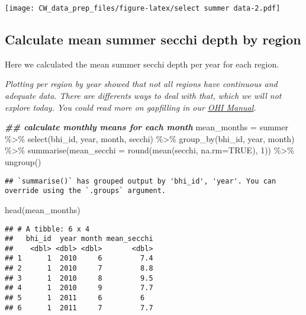 \documentclass[
]{article}
\newenvironment{Shaded}{\begin{snugshade}}{\end{snugshade}}
\newcommand{\AttributeTok}[1]{\textcolor[rgb]{0.77,0.63,0.00}{#1}}
\newcommand{\ConstantTok}[1]{\textcolor[rgb]{0.00,0.00,0.00}{#1}}
\newcommand{\DecValTok}[1]{\textcolor[rgb]{0.00,0.00,0.81}{#1}}
\newcommand{\DocumentationTok}[1]{\textcolor[rgb]{0.56,0.35,0.01}{\textbf{\textit{#1}}}}
\newcommand{\FunctionTok}[1]{\textcolor[rgb]{0.00,0.00,0.00}{#1}}
\newcommand{\NormalTok}[1]{#1}
\newcommand{\OtherTok}[1]{\textcolor[rgb]{0.56,0.35,0.01}{#1}}
\newcommand{\SpecialCharTok}[1]{\textcolor[rgb]{0.00,0.00,0.00}{#1}}
\begin{document}
\texttt{[image: CW\_data\_prep\_files/figure-latex/select summer data-2.pdf]}

\hypertarget{calculate-mean-summer-secchi-depth-by-region}{%
\subsection{Calculate mean summer secchi depth by
region}\label{calculate-mean-summer-secchi-depth-by-region}}

Here we calculated the mean summer secchi depth per year for each
region.

\emph{Plotting per region by year showed that not all regions have
continuous and adequate data. There are differents ways to deal with
that, which we will not explore today. You could read more on gapfilling
in our \href{http://ohi-science.org/manual/\#gapfilling}{OHI Manual}.}

\begin{Shaded}
\begin{Highlighting}[]
\DocumentationTok{\#\# calculate monthly means for each month}
\NormalTok{mean\_months }\OtherTok{=}\NormalTok{ summer }\SpecialCharTok{\%\textgreater{}\%} \FunctionTok{select}\NormalTok{(bhi\_id, year, month, secchi) }\SpecialCharTok{\%\textgreater{}\%}
              \FunctionTok{group\_by}\NormalTok{(bhi\_id, year, month) }\SpecialCharTok{\%\textgreater{}\%}
              \FunctionTok{summarise}\NormalTok{(}\AttributeTok{mean\_secchi =} \FunctionTok{round}\NormalTok{(}\FunctionTok{mean}\NormalTok{(secchi, }\AttributeTok{na.rm=}\ConstantTok{TRUE}\NormalTok{), }\DecValTok{1}\NormalTok{)) }\SpecialCharTok{\%\textgreater{}\%}
              \FunctionTok{ungroup}\NormalTok{()}
\end{Highlighting}
\end{Shaded}

\begin{verbatim}
## `summarise()` has grouped output by 'bhi_id', 'year'. You can override using the `.groups` argument.
\end{verbatim}

\begin{Shaded}
\begin{Highlighting}[]
\FunctionTok{head}\NormalTok{(mean\_months)}
\end{Highlighting}
\end{Shaded}

\begin{verbatim}
## # A tibble: 6 x 4
##   bhi_id  year month mean_secchi
##    <dbl> <dbl> <dbl>       <dbl>
## 1      1  2010     6         7.4
## 2      1  2010     7         8.8
## 3      1  2010     8         9.5
## 4      1  2010     9         7.7
## 5      1  2011     6         6  
## 6      1  2011     7         7.7
\end{verbatim}
\end{document}
